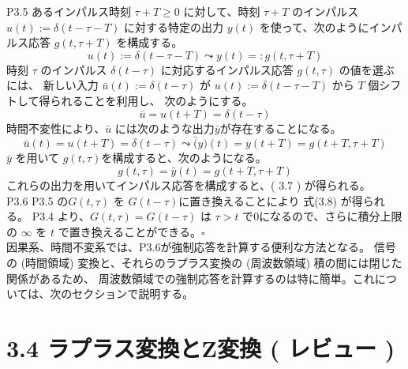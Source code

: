 \documentclass{jsarticle}
\begin{document}
P3.5\;\; あるインパルス時刻 $\tau + T\geq 0$ に対して、時刻 $\tau + T$ のインパルス 
$u ( t ) := \delta ( t - \tau - T )$ に対する特定の出力 $y ( t )$ を使って、次のようにインパルス応答 $g ( t , \tau + T )$ を構成する。
\begin{equation}
  u(t) := \delta(t-\tau-T) \leadsto y(t) =: g(t,\tau+T)
\end{equation}
時刻 $\tau$ のインパルス $\delta ( t-\tau )$ に対応するインパルス応答 $g ( t , \tau )$ の値を選ぶには、
新しい入力 $\bar{u} ( t ) := \delta( t - \tau )$ が $u ( t ) := \delta ( t -\tau- T )$ から $T$ 個シフトして得られることを利用し、
次のようにする。
\begin{equation}
  \bar{u} = u(t+T)=\delta(t-\tau)
\end{equation}
時間不変性により、$\bar{u}$ には次のような出力$\bar{y}$が存在することになる。
\begin{equation}
  \bar{u}(t)=u(t+T)=\delta(t-\tau) \leadsto \bar(y)(t)=y(t+T)=g(t+T,\tau+T)
\end{equation}
$\bar{y}$ を用いて $g ( t , \tau ) $を構成すると、次のようになる。
\begin{equation}
  g(t,\tau) = \bar{y}(t) = g(t+T,\tau+T)
\end{equation}
これらの出力を用いてインパルス応答を構成すると、( 3.7 ) が得られる。\\

P3.6 \;\;P3.5 の$ G ( t ,\tau )$ を $G ( t - \tau )$に置き換えることにより 式(3.8) が得られる。
P3.4 より、$G ( t , \tau ) = G ( t-\tau )$ は $\tau > t$ で$0$になるので、さらに積分上限の $\infty$ を $t$ で置き換えることができる。$\square$ \\

因果系、時間不変系では、P3.6が強制応答を計算する便利な方法となる。
信号の (時間領域) 変換と、それらのラプラス変換の (周波数領域) 積の間には閉じた関係があるため、
周波数領域での強制応答を計算するのは特に簡単。これについては、次のセクションで説明する。


\newpage
\section*{3.4 ラプラス変換とZ変換 ( レビュー )}
\end{document}
